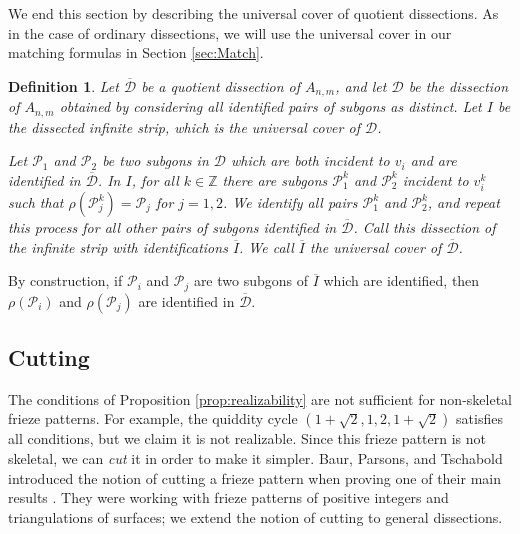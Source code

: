 \documentclass[12pt]{article}
\newtheorem{definition}{Definition}
\newtheorem{corollary}{Corollary}
\theoremstyle{remark}
\newcommand*{\poly}[1]{\mathcal{P}_{#1}}
\newcommand*{\D}{\mathcal{D}}
\begin{document}



We end this section by describing the universal cover of quotient dissections. As in the case of ordinary dissections, we will use the universal cover in our matching formulas in Section \ref{sec:Match}.

\begin{definition}
Let $\overline{\D}$ be a quotient dissection of $A_{n,m}$, and let $\D$ be the dissection of $A_{n,m}$ obtained by considering all identified pairs of subgons as distinct. Let $I$ be the dissected infinite strip, which is the universal cover of $\D$. 

Let $\poly{1}$ and $\poly{2}$ be two subgons in $\D$ which are both incident to $v_i$ and are identified in $\overline{\D}$. In $I$, for all $k \in \mathbb{Z}$ there are subgons $\poly{1}^k$ and $\poly{2}^k$ incident to $v_i^k$ such that $\rho(\poly{j}^k) = \poly{j}$ for $j = 1,2$. We identify all pairs $\poly{1}^k$ and $\poly{2}^k$, and repeat this process for all other pairs of subgons identified in $\overline{\D}$. Call this dissection of the infinite strip with identifications $\overline{I}$. We call $\overline{I}$ the universal cover of  $\overline{\D}$. 
\end{definition}

By construction, if $\poly{i}$ and $\poly{j}$ are two subgons of $\overline{I}$ which are identified, then $\rho(\poly{i})$ and $\rho(\poly{j})$ are identified in $\overline{\D}$. 

\subsection{Cutting}\label{subsec:Cut}

The conditions of Proposition \ref{prop:realizability} are not sufficient for non-skeletal frieze patterns. For example, the quiddity cycle $(1+\sqrt{2}, 1, 2, 1+\sqrt{2})$ satisfies all conditions, but we claim it is not realizable. Since this frieze pattern is not skeletal, we can \emph{cut} it in order to make it simpler. Baur, Parsons, and Tschabold introduced the notion of cutting a frieze pattern when proving one of their main results \cite{1}. They were working with frieze patterns of positive integers and triangulations of surfaces; we extend the notion of cutting to general dissections. 
\end{document}
